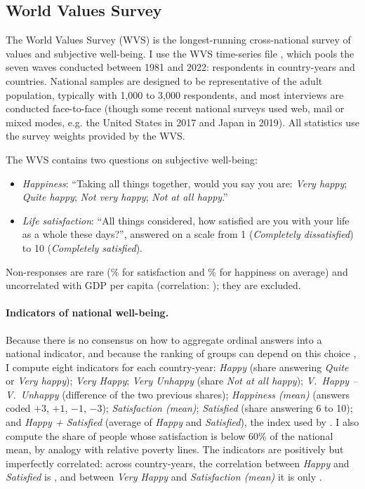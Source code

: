 \subsection{World Values Survey}\label{subsec:wvs}

The World Values Survey (WVS) is the longest-running cross-national survey of values and subjective well-being. I use the WVS time-series file \citep{wvs_trend_2022}, which pools the seven waves conducted between 1981 and 2022: \nWVSRespondents respondents in \nWVSCountryYears country-years and \nWVSCountries countries. National samples are designed to be representative of the adult population, typically with 1,000 to 3,000 respondents, and most interviews are conducted face-to-face (though some recent national surveys used web, mail or mixed modes, e.g. the United States in 2017 and Japan in 2019). All statistics use the survey weights provided by the WVS.

The WVS contains two questions on subjective well-being:
\begin{itemize}
    \item \textit{Happiness}: ``Taking all things together, would you say you are: \textit{Very happy}; \textit{Quite happy}; \textit{Not very happy}; \textit{Not at all happy}.''
    \item \textit{Life satisfaction}: ``All things considered, how satisfied are you with your life as a whole these days?'', answered on a scale from 1 (\textit{Completely dissatisfied}) to 10 (\textit{Completely satisfied}).
\end{itemize}
Non-responses are rare (\nonresponseSatisfactionWVS\% for satisfaction and \nonresponseHappinessWVS\% for happiness on average) and uncorrelated with GDP per capita (correlation: \corNonresponseGDP); they are excluded.

\ifshowregion
\paragraph{Indicators of national well-being.}
Because there is no consensus on how to aggregate ordinal answers into a national indicator, and because the ranking of groups can depend on this choice \citep{bond_sad_2019}, I compute eight indicators for each country-year: \textit{Happy} (share answering \textit{Quite} or \textit{Very happy}); \textit{Very Happy}; \textit{Very Unhappy} (share \textit{Not at all happy}); \textit{V.~Happy -- V.~Unhappy} (difference of the two previous shares); \textit{Happiness (mean)} (answers coded $+3$, $+1$, $-1$, $-3$); \textit{Satisfaction (mean)}; \textit{Satisfied} (share answering 6 to 10); and \textit{Happy + Satisfied} (average of \textit{Happy} and \textit{Satisfied}), the index used by \citet{inglehart_genes_2000}. I also compute the share of people whose satisfaction is below 60\% of the national mean, by analogy with relative poverty lines. The indicators are positively but imperfectly correlated: across country-years, the correlation between \textit{Happy} and \textit{Satisfied} is \corHappySatisfied, and between \textit{Very Happy} and \textit{Satisfaction (mean)} it is only \corVeryHappySatisfiedMean.
\fi

